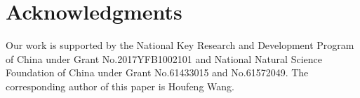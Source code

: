 \documentclass[11pt,a4paper]{article}
\begin{document}
\section*{Acknowledgments}

Our work is supported by the National Key Research and Development Program of China under Grant No.2017YFB1002101 and National Natural Science Foundation of China under Grant No.61433015 and No.61572049. The corresponding author of this paper is Houfeng Wang. \\





\appendix
\end{document}
